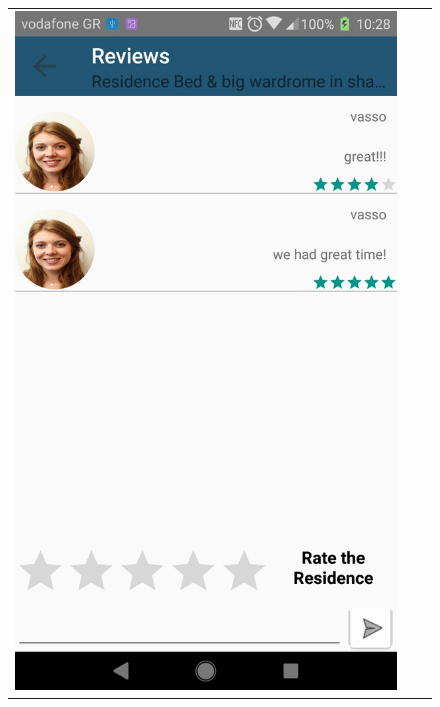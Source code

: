 \documentclass[12pt]{article}
\begin{document}
\begin{center}
\begin{figure}
\begin{tabular}{c c c}
				\includegraphics[scale=0.16, keepaspectratio]{15-reviews.jpg}  
				&

\end{tabular}
\end{figure}
\end{center}
\end{document}
